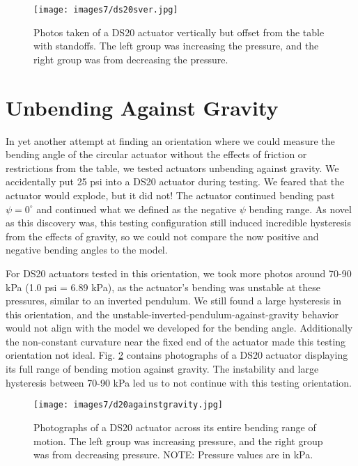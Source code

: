 \begin{figure}[!ht]
    \centering
     \texttt{[image: images7/ds20sver.jpg]}
    \caption{Photos taken of a DS20 actuator vertically but offset from the table with standoffs. The left group was increasing the pressure, and the right group was from decreasing the pressure.}
    \label{fig:ds20sver}
\end{figure}

\clearpage
\section{Unbending Against Gravity}

In yet another attempt at finding an orientation where we could measure the bending angle of the circular actuator without the effects of friction or restrictions from the table, we tested actuators unbending against gravity. We accidentally put 25 psi into a DS20 actuator during testing. We feared that the actuator would explode, but it did not! The actuator continued bending past $\psi=0^\circ$ and continued what we defined as the negative $\psi$ bending range. As novel as this discovery was, this testing configuration still induced incredible hysteresis from the effects of gravity, so we could not compare the now positive and negative bending angles to the model. 

For DS20 actuators tested in this orientation, we took more photos around 70-90 kPa (1.0 psi = 6.89 kPa), as the actuator's bending was unstable at these pressures, similar to an inverted pendulum. We still found a large hysteresis in this orientation, and the unstable-inverted-pendulum-against-gravity behavior would not align with the model we developed for the bending angle. Additionally the non-constant curvature near the fixed end of the actuator made this testing orientation not ideal. Fig. \ref{fig:d20againstgravity} contains photographs of a DS20 actuator displaying its full range of bending motion against gravity. The instability and large hysteresis between 70-90 kPa led us to not continue with this testing orientation. 

\begin{figure}[!ht]
    \centering
     \texttt{[image: images7/d20againstgravity.jpg]}
    \caption{Photographs of a DS20 actuator across its entire bending range of motion. The left group was increasing pressure, and the right group was from decreasing pressure. NOTE: Pressure values are in kPa.}
    \label{fig:d20againstgravity}
\end{figure}

